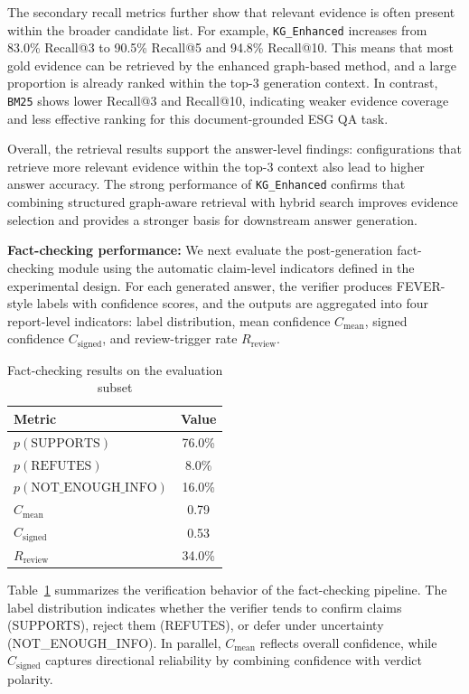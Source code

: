 \documentclass[sn-mathphys, oneside]{sn-jnl}
\begin{document}
The secondary recall metrics further show that relevant evidence is often present
within the broader candidate list. For example, \texttt{KG\_Enhanced} increases from
83.0\% Recall@3 to 90.5\% Recall@5 and 94.8\% Recall@10. This means that most gold
evidence can be retrieved by the enhanced graph-based method, and a large proportion
is already ranked within the top-3 generation context. In contrast, \texttt{BM25}
shows lower Recall@3 and Recall@10, indicating weaker evidence coverage and less
effective ranking for this document-grounded ESG QA task.

Overall, the retrieval results support the answer-level findings: configurations that
retrieve more relevant evidence within the top-3 context also lead to higher answer
accuracy. The strong performance of \texttt{KG\_Enhanced} confirms that combining
structured graph-aware retrieval with hybrid search improves evidence selection and
provides a stronger basis for downstream answer generation.

\textbf{Fact-checking performance: }We next evaluate the post-generation fact-checking module using the automatic
claim-level indicators defined in the experimental design. For each generated answer,
the verifier produces FEVER-style labels with confidence scores, and the outputs are
aggregated into four report-level indicators: label distribution, mean confidence
$C_{\mathrm{mean}}$, signed confidence $C_{\mathrm{signed}}$, and review-trigger rate
$R_{\mathrm{review}}$.

\begin{table}[htbp]
    \centering
    \caption{Fact-checking results on the evaluation subset}
    \label{tab:fact_checking_results}
    \begin{tabular}{lc}
    \toprule
    Metric & Value \\
    \midrule
    $p(\mathrm{SUPPORTS})$ & 76.0\% \\
    $p(\mathrm{REFUTES})$ & 8.0\% \\
    $p(\mathrm{NOT\_ENOUGH\_INFO})$ & 16.0\% \\
    $C_{\mathrm{mean}}$ & 0.79 \\
    $C_{\mathrm{signed}}$ & 0.53 \\
    $R_{\mathrm{review}}$ & 34.0\% \\
    \bottomrule
    \end{tabular}
\end{table}

Table~\ref{tab:fact_checking_results} summarizes the verification behavior of the
fact-checking pipeline. The label distribution indicates whether the verifier tends to
confirm claims (SUPPORTS), reject them (REFUTES), or defer under uncertainty
(NOT\_ENOUGH\_INFO). In parallel, $C_{\mathrm{mean}}$ reflects overall confidence,
while $C_{\mathrm{signed}}$ captures directional reliability by combining confidence
with verdict polarity.
\end{document}
